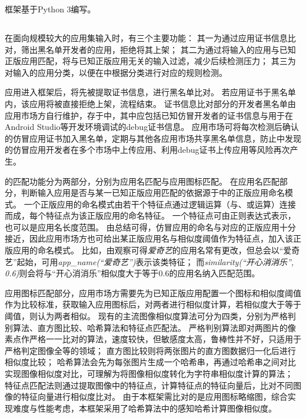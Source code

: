 框架基于Python 3编写。

\subsection{\componentA }
在面向规模较大的应用集输入时，\componentA 有三个主要功能：
其一为通过应用证书信息比对，筛出黑名单开发者的应用，拒绝将其上架；
其二为通过将输入的应用与已知正版应用匹配，将与已知正版应用无关的输入过滤，减少后续检测压力；
其三为对输入的应用分类，以便在\componentC 中根据分类进行对应的规则检测。

应用进入框架后，将先被提取证书信息，进行黑名单比对。
若应用证书于黑名单内，该应用将被直接拒绝上架，流程结束。
证书信息比对部分的开发者黑名单由应用市场方自行维护，存于\componentD 中，其中应包括已知仿冒开发者的证书信息与用于在Android Studio等开发环境调试的debug证书信息。
应用市场可将每次检测后确认的仿冒应用证书加入黑名单，定期与其他各应用市场共享黑名单信息，防止中发现的仿冒应用开发者在多个市场中上传应用、利用debug证书上传应用等风险再次产生。

\componentA 的匹配功能分为两部分，分别为应用名匹配与应用图标匹配。
在应用名匹配部分，判断输入应用是否与某一已知正版应用匹配的依据源于\componentD 中的正版应用命名模式。
一个正版应用的命名模式由若干个特征点通过逻辑运算（与、或运算）连接而成，每个特征点为该正版应用的命名特征。
一个特征点可由正则表达式表示，也可以是应用名长度范围。
由总结可得，仿冒应用的命名与对应的正版应用十分接近，因此应用市场方也可给出某正版应用名与相似度阈值作为特征点，加入该正版应用的命名模式。
比如，由观察可得\textit{爱奇艺}的应用名常有更改，但总会以``爱奇艺''起始，可用\textit{app\_name(``爱奇艺\*'')}表示该类特征；
而\textit{similarity(``开心消消乐'', 0.6)}则会将与``开心消消乐''相似度大于等于0.6的应用名纳入匹配范围。

应用图标匹配部分，应用市场方需要先为已知正版应用配置一个图标和相似度阈值作为比较标准，\componentA 获取输入应用图标后，对两者进行相似度计算，若相似度大于等于阈值，则认为两者相似。
现有的主流图像相似度算法可分为四类，分别为严格判别算法、直方图比较、哈希算法和特征点匹配法。
严格判别算法即对两图片的像素点作严格一一比对的算法，速度较快，但敏感度太高，鲁棒性并不好，只适用于严格判定图像全等的领域；
直方图比较则将两张图片的直方图数据归一化后进行相似度比较；
哈希算法会先为每张图片生成一个哈希串，再通过哈希串之间对比实现图像相似度对比，可理解为将图像相似度转化为字符串相似度计算的算法；
特征点匹配法则通过提取图像中的特征点，计算特征点的特征向量后，比对不同图像的特征向量进行相似度比对。
由于本框架需比对的是应用图标略缩图，综合实现难度与性能考虑，本框架采用了哈希算法中的感知哈希计算图像相似度。

